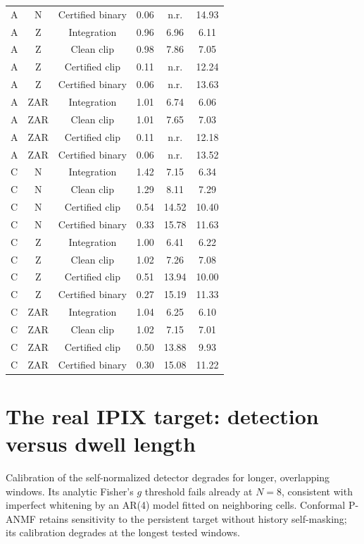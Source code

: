 \documentclass[10pt]{article}
\begin{document}
\begin{table}[htbp]
\begin{tabular}{lccccc}
A & N & Certified binary & 0.06 & n.r. & 14.93 \\
A & Z & Integration & 0.96 & 6.96 & 6.11 \\
A & Z & Clean clip & 0.98 & 7.86 & 7.05 \\
A & Z & Certified clip & 0.11 & n.r. & 12.24 \\
A & Z & Certified binary & 0.06 & n.r. & 13.63 \\
A & ZAR & Integration & 1.01 & 6.74 & 6.06 \\
A & ZAR & Clean clip & 1.01 & 7.65 & 7.03 \\
A & ZAR & Certified clip & 0.11 & n.r. & 12.18 \\
A & ZAR & Certified binary & 0.06 & n.r. & 13.52 \\
C & N & Integration & 1.42 & 7.15 & 6.34 \\
C & N & Clean clip & 1.29 & 8.11 & 7.29 \\
C & N & Certified clip & 0.54 & 14.52 & 10.40 \\
C & N & Certified binary & 0.33 & 15.78 & 11.63 \\
C & Z & Integration & 1.00 & 6.41 & 6.22 \\
C & Z & Clean clip & 1.02 & 7.26 & 7.08 \\
C & Z & Certified clip & 0.51 & 13.94 & 10.00 \\
C & Z & Certified binary & 0.27 & 15.19 & 11.33 \\
C & ZAR & Integration & 1.04 & 6.25 & 6.10 \\
C & ZAR & Clean clip & 1.02 & 7.15 & 7.01 \\
C & ZAR & Certified clip & 0.50 & 13.88 & 9.93 \\
C & ZAR & Certified binary & 0.30 & 15.08 & 11.22 \\
\bottomrule
\end{tabular}
\end{table}

\section{The real IPIX target: detection versus dwell length}\label{sup:target}
\begin{table}[h]
\centering\small
\caption{Real IPIX target (primary cell, test thirds, 56 units): mean $P_{\rm d}$ at design $P_{\rm fa}=10^{-3}$ versus dwell $N$. In parentheses: measured clutter $P_{\rm fa}$ ($\times10^{-3}$). P-ANMF with Fisher's $g$ uses the analytic threshold.}
\label{tab:target}

\end{table}
Calibration of the self-normalized detector degrades for longer, overlapping windows. Its analytic Fisher's $g$ threshold fails already at $N=8$, consistent with imperfect whitening by an AR(4) model fitted on neighboring cells. Conformal P-ANMF retains sensitivity to the persistent target without history self-masking; its calibration degrades at the longest tested windows.
\end{document}
